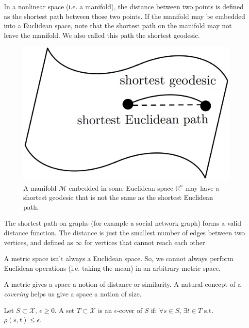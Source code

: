 \begin{example}[Geodesics] In a nonlinear space (i.e. a manifold),
the distance between two points is defined as the shortest path
between those two points. If the manifold may be embedded into a
Euclidean space, note that the shortest path on the manifold may
not leave the manifold. We also called this path the shortest 
geodesic.
\end{example}
\begin{figure}
    \centering
    \captionsetup{width=0.8\textwidth}
    \includegraphics[scale=0.3]{chapter_1/files/geodesic.jpg}
    \caption{A manifold $\mathcal{M}$ embedded in some Euclidean
    space $\mathbb{R}^n$ may have a shortest geodesic that is
    not the same as the shortest Euclidean path.}
    \label{fig:geodesic}
\end{figure}
\begin{example} The shortest path on graphs (for 
example a social network graph) forms a valid distance function. The
distance is just the smallest number of edges between two vertices, 
and defined as $\infty$ for vertices that cannot reach each other.
\end{example}
\begin{remark}
A metric space isn't always a Euclidean space. So, we cannot always
perform Euclidean operations (i.e. taking the mean) in an arbitrary
metric space.
\end{remark}

A metric gives a space a notion of distance or similarity. A natural
concept of a \emph{covering} helps us give a space a notion of size.

\begin{definition}[Cover]
Let $S \subset \mathcal{X}$, $\epsilon \geq 0$. A set $T \subset
\mathcal{X}$ is an $\epsilon$-cover of $S$ if:  $\forall s \in S$,
$\exists t \in T$ s.t. $\rho(s,t) \le \epsilon$.
\end{definition}

